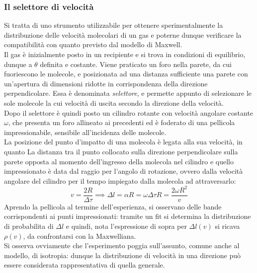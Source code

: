 \documentclass[10pt, oneside]{book}
\begin{document}
\subsubsection{Il selettore di velocità}
Si tratta di uno strumento utilizzabile per ottenere sperimentalmente la distribuzione delle velocità molecolari di un gas e poterne dunque verificare la compatibilità con quanto previsto dal modello di Maxwell.\\
Il gas è inizialmente posto in un recipiente e si trova in condizioni di equilibrio, dunque a $\theta$ definita e costante. Viene praticato un foro nella parete, da cui fuoriescono le molecole, e posizionata ad una distanza sufficiente una parete con un'apertura di dimensioni ridotte in corrispondenza della direzione perpendicolare. Essa è denominata \textit{selettore}, e permette appunto di selezionare le sole molecole la cui velocità di uscita secondo la direzione della velocità.\\
Dopo il selettore è quindi posto un cilindro rotante con velocità angolare costante $\omega$, che presenta un foro allineato ai precedenti ed è foderato di una pellicola impressionabile, sensibile all'incidenza delle molecole.\\
La posizione del punto d'impatto di una molecola è legata alla sua velocità, in quanto La distanza tra il punto collocato sulla direzione perpendicolare sulla parete opposta al momento dell'ingresso della molecola nel cilindro e quello impressionato è data dal raggio per l'angolo di rotazione, ovvero dalla velocità angolare del cilindro per il tempo impiegato dalla molecola ad attraversarlo:
\[v = \frac{2 R}{\Delta \tau} \implies \Delta l = \alpha R = \omega \Delta \tau R = \frac{2 \omega R^2}{v}\]
Aprendo la pellicola al termine dell'esperienza, si osservano delle bande corrispondenti ai punti impressionati: tramite un fit si determina la distribuzione di probabilita di $\Delta l$ e quindi, nota l'espressione di sopra per $\Delta l(v)$ si ricava $\rho(v)$, da confrontarsi con la Maxwelliana.\\
Si osserva ovviamente che l'esperimento poggia sull'assunto, comune anche al modello, di isotropia: dunque la distribuzione di velocità in una direzione può essere considerata rappresentativa di quella generale.
\end{document}
